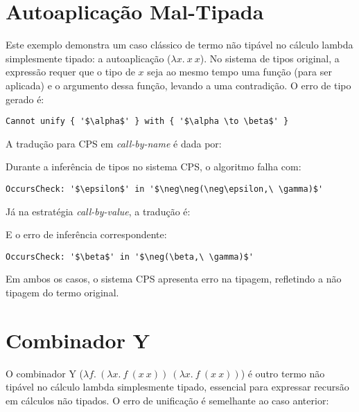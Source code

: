 \section{Autoaplicação Mal-Tipada}\label{sec:autoap-mal-tipada}
Este exemplo demonstra um caso clássico de termo não tipável no cálculo lambda simplesmente tipado: a autoaplicação ($\lambda x.\ x\ x$).
No sistema de tipos original, a expressão requer que o tipo de $x$ seja ao mesmo tempo uma função (para ser aplicada) e o argumento dessa função, levando a uma contradição.
O erro de tipo gerado é:

\lstset{extendedchars=false, escapeinside=''}
\begin{lstlisting}[style=output,caption={Erro de tipo no cálculo lambda original}]
  Cannot unify { '$\alpha$' } with { '$\alpha \to \beta$' }
\end{lstlisting}
A tradução para CPS em \textit{call-by-name} é dada por:

Durante a inferência de tipos no sistema CPS, o algoritmo falha com:
\begin{lstlisting}[style=output,caption={Erro de inferência em CBN}]
  OccursCheck: '$\epsilon$' in '$\neg\neg(\neg\epsilon,\ \gamma)$'
\end{lstlisting}
Já na estratégia \textit{call-by-value}, a tradução é:

E o erro de inferência correspondente:
\begin{lstlisting}[style=output,caption={Erro de inferência em CBV}]
  OccursCheck: '$\beta$' in '$\neg(\beta,\ \gamma)$'
\end{lstlisting}
Em ambos os casos, o sistema CPS apresenta erro na tipagem, refletindo a não tipagem do termo original.

\section{Combinador Y}\label{sec:y-combinator}
O combinador Y ($\lambda f.\ (\lambda x.\ f\ (x\ x))\ (\lambda x.\ f\ (x\ x))$) é outro termo não tipável no cálculo lambda simplesmente tipado, essencial para expressar recursão em cálculos não tipados.
O erro de unificação é semelhante ao caso anterior:

